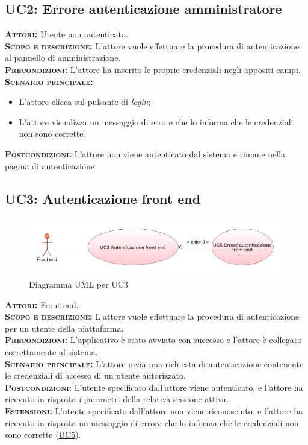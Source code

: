 \subsection{UC2: Errore autenticazione amministratore}
\label{sec:uc2}
\textsc{\textbf{Attori:}} Utente non autenticato.\\
\textsc{\textbf{Scopo e descrizione:}} L'attore vuole effettuare la procedura di autenticazione al pannello di amministrazione.\\
\textsc{\textsc{\textbf{Precondizioni:}}} L'attore ha inserito le proprie credenziali negli appositi campi.\\
\textsc{\textbf{Scenario principale:}}
\begin{itemize}
    \item L'attore clicca sul pulsante di \textit{login};
    \item L'attore visualizza un messaggio di errore che lo informa che le credenziali non sono corrette.
\end{itemize}
\textsc{\textbf{Postcondizioni:}} L'attore non viene autenticato dal sistema e rimane nella pagina di autenticazione.

\subsection{UC3: Autenticazione front end}
\label{sec:uc3}
\label{sec:uc1}
\begin{figure}[h!]
    \centering
    \includegraphics[width=\textwidth]{figures/uc/uc3gen.png}
    \caption[Diagramma UML per UC3]{Diagramma UML per UC3
    \label{fig:uc1}}
\end{figure}   
\textsc{\textbf{Attori:}} Front end.\\
\textsc{\textbf{Scopo e descrizione:}} L'attore vuole effettuare la procedura di autenticazione per un utente della piattaforma.\\
\textsc{\textsc{\textbf{Precondizioni:}}} L'applicativo è stato avviato con successo e l'attore è collegato correttamente al sistema.\\
\textsc{\textbf{Scenario principale:}} L'attore invia una richiesta di autenticazione contenente le credenziali di accesso di un utente autorizzato.\\
\textsc{\textbf{Postcondizioni:}} L'utente specificato dall'attore viene autenticato, e l'attore ha ricevuto in risposta i parametri della relativa sessione attiva.\\
\textsc{\textbf{Estensioni:}}  L'utente specificato dall'attore non viene riconosciuto, e l'attore ha ricevuto in risposta un messaggio di errore che lo informa che le credenziali non sono corrette (\hyperref[sec:UC5]{UC5}).

